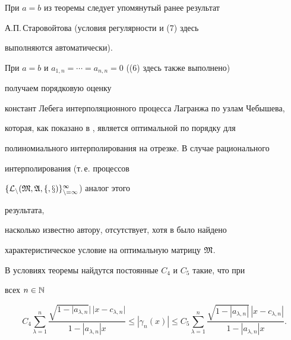\begin{note}


При $a=b$ из теоремы следует упомянутый ранее результат


А.П.\,Старовойтова \cite{8} (условия регулярности и (7) здесь


выполняются автоматически).


\end{note}





\begin{note}


При $a=b$ и $a_{1,n}=\dotsb=a_{n,n}=0$ ((6) здесь также выполнено)


получаем порядковую оценку


констант Лебега интерполяционного процесса Лагранжа по узлам Чебышева,


которая, как показано в \cite{14}, является оптимальной по порядку для


полиномиального интерполирования на отрезке. В случае рационального


интерполирования (т.\,е. процессов


$\{\cal L_n(\frak M,\frak A,f,x)\}^\infty_{n=1}$) аналог этого


результата,


насколько известно автору, отсутствует, хотя в \cite{15} было найдено


характеристическое условие на оптимальную матрицу $\frak M$.


\end{note}


\setcounter{lem}{1}





\begin{lem}


В условиях теоремы найдутся постоянные $C_4$ и $C_5$ такие, что при


всех $n\in\Bbb N$


\begin{equation}


C_4\sum^n_{\lambda=1}


\frac{\sqrt{1-|a_{\lambda,n}}|\,|x-c_{\lambda,n}|}


{1-|a_{\lambda,n}|x}\le|\gamma_n(x)|\le


C_5\sum^n_{\lambda=1}


\frac{\sqrt{1-|a_{\lambda,n}|}\,|x-c_{\lambda,n}|}


{1-|a_{\lambda,n}|x}.


\end{equation}


\end{lem}





